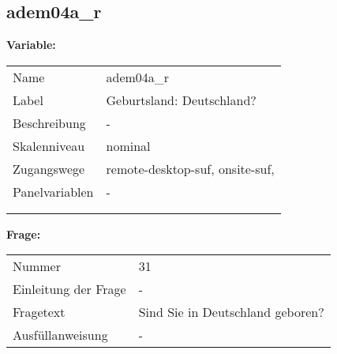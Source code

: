 	
	
	\subsection{adem04a\_r}
	\label{subSection:adem04a_r}

	\noindent\textbf{Variable:}\\
		\begin{tabular}{lL{11.3cm}}
			\label{tableVariable:adem04a_r}
			Name & adem04a\_r \\
			Label & Geburtsland: Deutschland? \\
			Beschreibung & - \\
			Skalenniveau & nominal \\
			Zugangswege &
				remote-desktop-suf,
				onsite-suf,
 \\
			Panelvariablen & -
			 \\
			 \\
 \\
		\end{tabular}

		\vspace*{1 cm}
		\noindent\textbf{Frage:}\\
		\begin{tabular}{lL{11.3cm}}
			\label{tableQuestion:adem04a_r}
			Nummer & 31 \\
			Einleitung der Frage & - \\
			Fragetext & Sind Sie in Deutschland geboren? \\
			Ausfüllanweisung & - \\
		\end{tabular}





